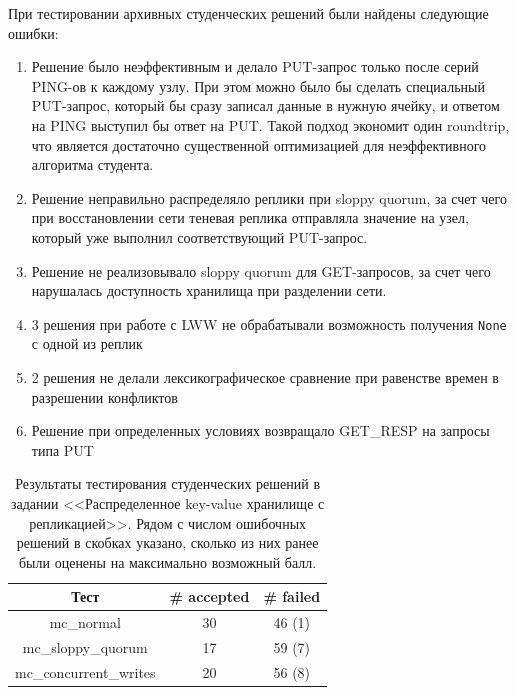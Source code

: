 \documentclass[a4paper,12pt]{extarticle}
\begin{document}
При тестировании архивных студенческих решений были найдены следующие ошибки:
\begin{enumerate}
    \item Решение было неэффективным и делало PUT-запрос только после серий PING-ов к каждому узлу.
При этом можно было бы сделать специальный PUT-запрос, который бы сразу записал данные в нужную ячейку, и ответом на PING выступил бы ответ на PUT.
Такой подход экономит один roundtrip, что является достаточно существенной оптимизацией для неэффективного алгоритма студента.
    \item Решение неправильно распределяло реплики при sloppy quorum, за счет чего при восстановлении сети теневая реплика отправляла значение на узел, который уже выполнил соответствующий PUT-запрос.
    \item Решение не реализовывало sloppy quorum для GET-запросов, за счет чего нарушалась доступность хранилища при разделении сети.
    \item 3 решения при работе с LWW не обрабатывали возможность получения \texttt{None} с одной из реплик
    \item 2 решения не делали лексикографическое сравнение при равенстве времен в разрешении конфликтов
    \item Решение при определенных условиях возвращало GET\_RESP на запросы типа PUT
\end{enumerate} 



\begin{table}[htbp]
    \caption{Результаты тестирования студенческих решений в задании <<Распределенное key-value хранилище с репликацией>>. Рядом с числом ошибочных решений в скобках указано, сколько из них ранее были оценены на максимально возможный балл. }
    \begin{center}
    \begin{tabular}{|c|c|c|}
    \hline
    \textbf{Тест} & \textbf{\# accepted} & \textbf{\# failed}  \\
    \hline
    mc\_normal  & 30 & 46 (1) \\
    \hline
    mc\_sloppy\_quorum  & 17 & 59 (7) \\
    \hline
    mc\_concurrent\_writes & 20 & 56 (8) \\
    \hline

    \end{tabular}
    \label{tab9}
    \end{center}
\end{table}
\end{document}
